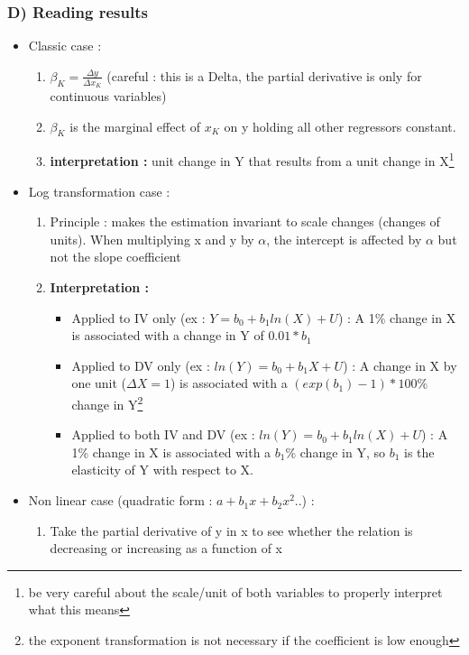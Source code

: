 \documentclass{article}
\begin{document}
\subsubsection{D) Reading results}
\begin{itemize}
    \item Classic case : 
    \begin{enumerate}
        \item $\beta_K = \frac{\Delta y}{\Delta x_K}$  (careful : this is a Delta, the partial derivative is only for continuous variables)
        \item $\beta_K$ is the marginal effect of $x_K$ on y holding all other regressors constant. 
        \item \textbf{interpretation :} unit change in Y that results from a unit change in X\footnote{be very careful about the scale/unit of both variables to properly interpret what this means}
    \end{enumerate}
    \item Log transformation case : 
    \begin{enumerate}
        \item Principle : makes the estimation invariant to scale changes (changes of units). When multiplying x and y by $\alpha$, the intercept is affected by $\alpha$ but not the slope coefficient
        \item \textbf{Interpretation : }
        \begin{itemize}
            \item Applied to IV only (ex : $Y = b_0 + b_1ln(X)+U$) : A 1\% change in X is associated with a change in Y of $0.01*b_1$
            \item Applied to DV only (ex : $ln(Y) = b_0 + b_1X+U$) : A change in X by one unit ($\Delta X=1$) is associated with a $(exp(b_1) - 1)*100 \%$ change in Y\footnote{the exponent transformation is not necessary if the coefficient is low enough}
            \item Applied to both IV and DV (ex : $ln(Y) = b_0 + b_1ln(X)+U$) : A 1\% change in X is associated with a $b_1\%$ change in Y, so $b_1$ is the elasticity of Y with respect to X.
        \end{itemize}
    \end{enumerate}
    \item Non linear case (quadratic form : $a + b_1x + b_2x^2$..) : 
    \begin{enumerate}
        \item Take the partial derivative of y in x to see whether the relation is decreasing or increasing as a function of x

\end{enumerate}
\end{itemize}
\end{document}
